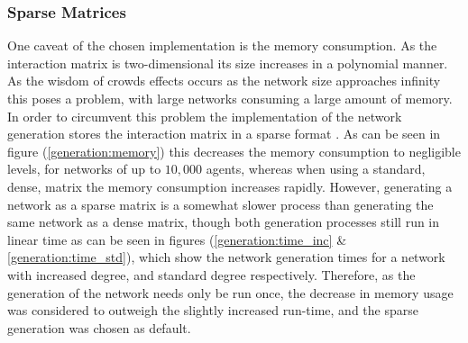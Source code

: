 \documentclass{article}
\begin{document}
\newpage

\subsubsection{Sparse Matrices}

One caveat of the chosen implementation is the memory consumption. As the interaction matrix is two-dimensional its size increases in a polynomial manner. As the wisdom of crowds effects occurs as the network size approaches infinity this poses a problem, with large networks consuming a large amount of memory. In order to circumvent this problem the implementation of the network generation stores the interaction matrix in a sparse format \cite{2020SciPy-NMeth}. As can be seen in figure (\ref{generation:memory}) this decreases the memory consumption to negligible levels, for networks of up to $10,000$ agents, whereas when using a standard, dense, matrix the memory consumption increases rapidly. \newline
However, generating a network as a sparse matrix is a somewhat slower process than generating the same network as a dense matrix, though both generation processes still run in linear time as can be seen in figures (\ref{generation:time_inc} \& \ref{generation:time_std}),  which show the network generation times for a network with increased degree, and standard degree respectively. Therefore, as the generation of the network needs only be run once, the decrease in memory usage was considered to outweigh the slightly increased run-time, and the sparse generation was chosen as default.
\end{document}
